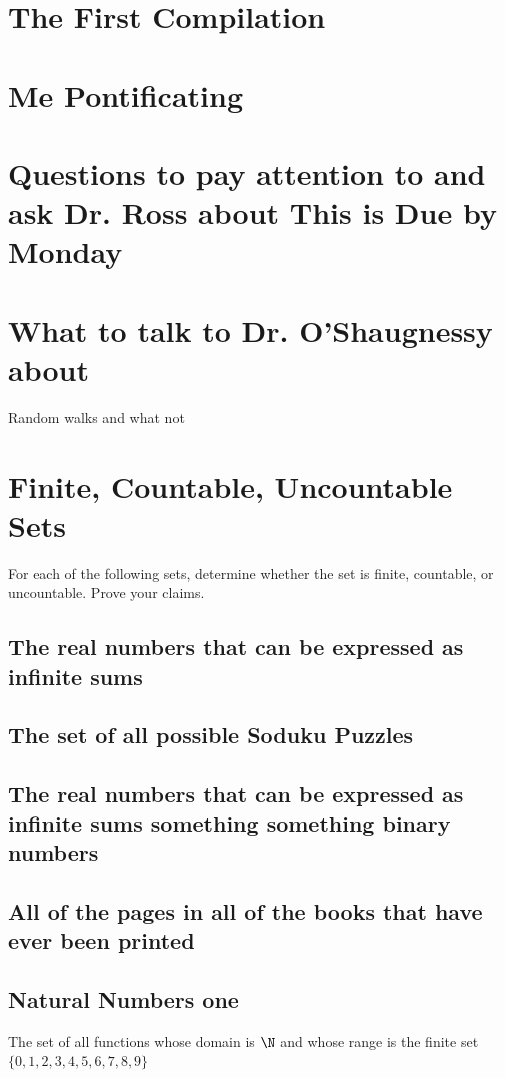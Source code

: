 \section{The First Compilation}

\section*{Me Pontificating}

\section*{Questions to pay attention to and ask Dr. Ross about This is Due by Monday}
\section*{What to talk to Dr. O'Shaugnessy about}
Random walks and what not 
\section*{Finite, Countable, Uncountable Sets}
For each of the following sets, determine whether the set is finite, countable, or uncountable. Prove your claims. \\
\subsection*{The real numbers that can be expressed as infinite sums}

\subsection*{The set of all possible Soduku Puzzles}


\subsection*{The real numbers that can be expressed as infinite sums something something binary numbers}


\subsection*{All of the pages in all of the books that have ever been printed}

\subsection{Natural Numbers one}
The set of all functions whose domain is $\N$ and whose range is the finite set $\{0,1,2,3,4,5,6,7,8,9\}$

